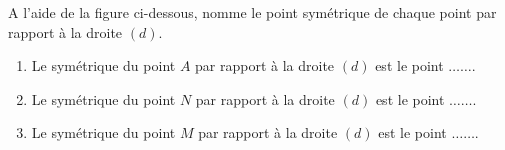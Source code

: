 \begin{pageAD}

 
\begin{minipage}{0.58\linewidth}

A l'aide de la figure ci-dessous, nomme le point symétrique de chaque point par rapport à la droite $(d)$.
 
\begin{enumerate}
\item Le symétrique du point $A$ par rapport à la droite $(d)$ est le point $\ldots\ldots$.\vspace{0.2cm}
\item Le symétrique du point $N$ par rapport à la droite $(d)$ est le point $\ldots\ldots$.\vspace{0.2cm}
\item Le symétrique du point $M$ par rapport à la droite $(d)$ est le point $\ldots\ldots$.
\end{enumerate}

\end{minipage}
\hfill
\begin{minipage}{0.38\linewidth}


\end{minipage}
\end{pageAD}
